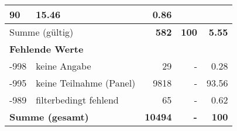 \begin{longtable}{lXrrr}
       \num{90} &
       \num[round-mode=places,round-precision=2]{15.46} &
         \num[round-mode=places,round-precision=2]{0.86} \\
     \midrule
     \multicolumn{2}{l}{Summe (gültig)} &
       \textbf{\num{582}} &
     \textbf{\num{100}} &
       \textbf{\num[round-mode=places,round-precision=2]{5.55}} \\
     \multicolumn{5}{l}{\textbf{Fehlende Werte}}\\
       -998 &
       keine Angabe &
         \num{29} &
        - &
         \num[round-mode=places,round-precision=2]{0.28} \\
       -995 &
       keine Teilnahme (Panel) &
         \num{9818} &
        - &
         \num[round-mode=places,round-precision=2]{93.56} \\
       -989 &
       filterbedingt fehlend &
         \num{65} &
        - &
         \num[round-mode=places,round-precision=2]{0.62} \\
     \midrule
     \multicolumn{2}{l}{\textbf{Summe (gesamt)}} &
          \textbf{\num{10494}} &
        \textbf{-} &
        \textbf{\num{100}} \\
     \bottomrule
     \end{longtable}
     
